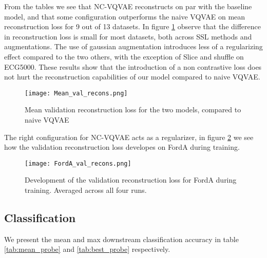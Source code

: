 \documentclass[../../thesis.tex]{subfiles}
\begin{document}
From the tables we see that NC-VQVAE reconstructs on par with the baseline model, and that some configuration outperforms the naive VQVAE on mean reconstruction loss for 9 out of 13 datasets. In figure \ref{fig:Mean_val_recons} observe that the difference in reconstruction loss is small for most datasets, both across SSL methods and augmentations. The use of gaussian augmentation introduces less of a regularizing effect compared to the two others, with the exception of Slice and shuffle on ECG5000. These results show that the introduction of a non contrastive loss does not hurt the reconstruction capabilities of our model compared to naive VQVAE.


\begin{figure}[H]
    \label{fig:Mean_val_recons}
    \texttt{[image: Mean\_val\_recons.png]}
    \centering  
    \caption{Mean validation reconstruction loss for the two models, compared to naive VQVAE}
\end{figure}

The right configuration for NC-VQVAE acts as a regularizer, in figure \ref{fig:FordA_val_recons} we see how the validation reconstruction loss developes on FordA during training. 

\begin{figure}[H]
    \label{fig:FordA_val_recons}
    \texttt{[image: FordA\_val\_recons.png]}
    \centering  
    \caption{Development of the validation reconstruction loss for FordA during training. Averaged across all four runs. }
\end{figure}



\subsection{Classification}

We present the mean and max downstream classification accuracy in table \ref{tab:mean_probe} and \ref{tab:best_probe} respectively. 
\end{document}

